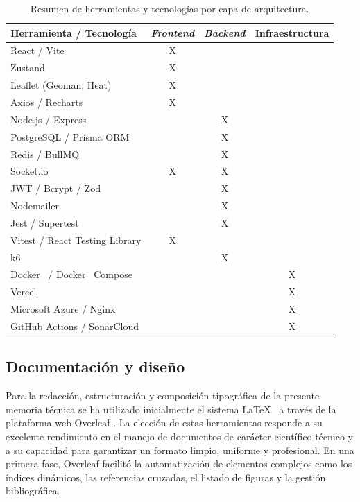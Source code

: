 \begin{table}[h]
\centering
{}
\begin{tabular}{l c c c}
\toprule
\textbf{Herramienta / Tecnología} & \textbf{\textit{Frontend}} & \textbf{\textit{Backend}} & \textbf{Infraestructura} \\
\midrule
React / Vite & X & & \\
Zustand & X & & \\
Leaflet (Geoman, Heat) & X & & \\
Axios / Recharts & X & & \\
Node.js / Express & & X & \\
PostgreSQL / Prisma ORM & & X & \\
Redis / BullMQ & & X & \\
Socket.io & X & X & \\
JWT / Bcrypt / Zod & & X & \\
Nodemailer & & X & \\
Jest / Supertest & & X & \\
Vitest / React Testing Library & X & & \\
k6 & & X & \\
Docker~\cite{docker} / Docker~\cite{docker} Compose & & & X \\
Vercel & & & X \\
Microsoft Azure / Nginx & & & X \\
GitHub Actions / SonarCloud & & & X \\
\bottomrule
\end{tabular}
\caption{Resumen de herramientas y tecnologías por capa de arquitectura.}
\label{tab:tecnologias}
\end{table}

\subsection{Documentación y diseño}
Para la redacción, estructuración y composición tipográfica de la presente memoria técnica se ha utilizado inicialmente el sistema \LaTeX \ \cite{latex} a través de la plataforma web Overleaf \cite{overleaf}. La elección de estas herramientas responde a su excelente rendimiento en el manejo de documentos de carácter científico-técnico y a su capacidad para garantizar un formato limpio, uniforme y profesional. En una primera fase, Overleaf facilitó la automatización de elementos complejos como los índices dinámicos, las referencias cruzadas, el listado de figuras y la gestión bibliográfica.

